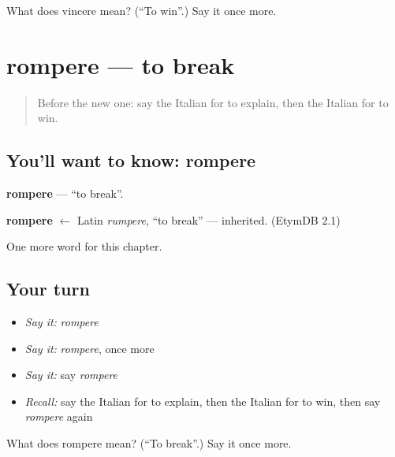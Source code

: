 \begin{tcolorbox}[breakable,colback=teal!4,colframe=teal!35!black,title={Before you move on}]
What does vincere mean? (\textquotedblleft{}To win\textquotedblright{}.) Say it once more.
\end{tcolorbox}
\section[rompere]{rompere — to break}

\label{lesson:IT-C142-rompere}



\begin{quote}
Before the new one: say the Italian for to explain, then the Italian for to win.
\end{quote}

\subsection*{You'll want to know: rompere}
\textbf{rompere} — \textquotedblleft{}to break\textquotedblright{}.

\begin{cousinweb}
\textbf{rompere} $\leftarrow$ Latin \emph{rumpere}, \textquotedblleft{}to break\textquotedblright{} — inherited. (EtymDB 2.1)
\end{cousinweb}

\begin{grammarlens}[title={What you've built}]
One more word for this chapter.
\end{grammarlens}

\subsection*{Your turn}
\begin{itemize}
\raggedright
  \item \emph{Say it:} \emph{rompere}
  \item \emph{Say it:} \emph{rompere}, once more
  \item \emph{Say it:} say \emph{rompere}
  \item \emph{Recall:} say the Italian for to explain, then the Italian for to win, then say \emph{rompere} again
\end{itemize}

\begin{tcolorbox}[breakable,colback=teal!4,colframe=teal!35!black,title={Before you move on}]
What does rompere mean? (\textquotedblleft{}To break\textquotedblright{}.) Say it once more.
\end{tcolorbox}
